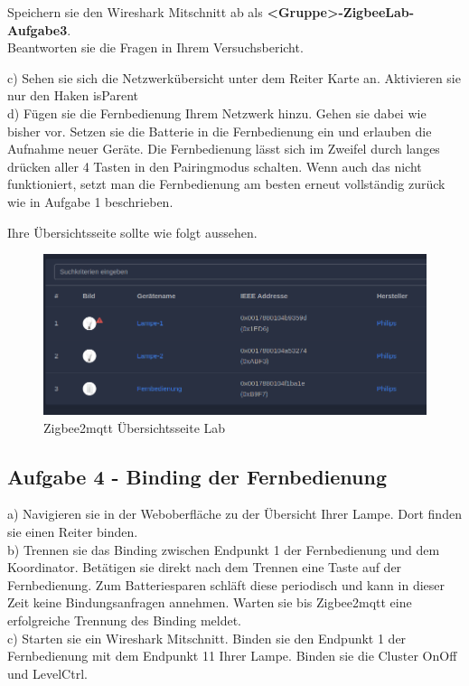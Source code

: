 \begin{Aufgabe}
    Speichern sie den Wireshark Mitschnitt ab als \textbf{\grqq <Gruppe>-ZigbeeLab-Aufgabe3\grqq{}}. \\
    Beantworten sie die Fragen in Ihrem Versuchsbericht.
\end{Aufgabe}

c) Sehen sie sich die Netzwerkübersicht unter dem Reiter \grqq Karte\grqq{} an. Aktivieren sie nur den Haken \grqq isParent\grqq{} \\
d) Fügen sie die Fernbedienung Ihrem Netzwerk hinzu. Gehen sie dabei wie bisher vor. Setzen sie die Batterie in die Fernbedienung ein und erlauben die Aufnahme neuer Geräte.
Die Fernbedienung lässt sich im Zweifel durch langes drücken aller 4 Tasten in den Pairingmodus schalten. Wenn auch das nicht funktioniert, setzt man 
die Fernbedienung am besten erneut vollständig zurück wie in Aufgabe 1 beschrieben.


Ihre Übersichtsseite sollte wie folgt aussehen.

\begin{figure}[H]
    \centering
    \includegraphics[width=1\textwidth]{media/z2m-ov.png}
    \caption{Zigbee2mqtt Übersichtsseite Lab}
\end{figure}


\subsection{Aufgabe 4 - Binding der Fernbedienung}

a) Navigieren sie in der Weboberfläche zu der Übersicht Ihrer Lampe. Dort finden sie einen Reiter \grqq binden\grqq{}. \\
b) Trennen sie das Binding zwischen Endpunkt 1 der Fernbedienung und dem Koordinator. Betätigen sie direkt nach dem Trennen eine Taste auf der Fernbedienung. Zum Batteriesparen \grqq schläft\grqq{} diese 
periodisch und kann in dieser Zeit keine Bindungsanfragen annehmen. 
Warten sie bis Zigbee2mqtt eine erfolgreiche Trennung  des Binding meldet. \\
c) Starten sie ein Wireshark Mitschnitt. Binden sie den Endpunkt 1 der Fernbedienung mit dem Endpunkt 11 Ihrer Lampe. Binden sie die Cluster \grqq OnOff\grqq{}
und \grqq LevelCtrl\grqq{}. 





